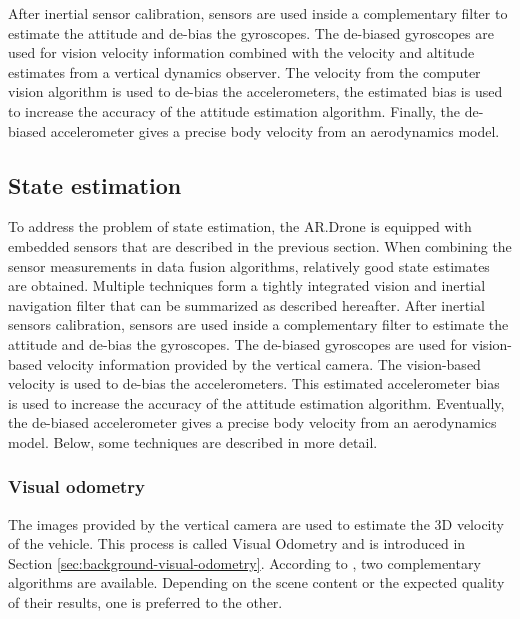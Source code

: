 After inertial sensor calibration, sensors are used inside a complementary filter to estimate the attitude and de-bias the gyroscopes.
The de-biased gyroscopes are used for vision velocity information combined with the velocity and altitude estimates from a vertical dynamics observer.
The velocity from the computer vision algorithm is used to de-bias the accelerometers, the estimated bias is used to increase the accuracy of the attitude estimation algorithm.
Finally, the de-biased accelerometer gives a precise body velocity from an aerodynamics model.


\subsection{State estimation}
To address the problem of state estimation, the AR.Drone is equipped with embedded sensors that are described in the previous section.
When combining the sensor measurements in data fusion algorithms, relatively good state estimates are obtained.
Multiple techniques form a tightly integrated vision and inertial navigation filter that can be summarized as described hereafter.
After inertial sensors calibration, sensors are used inside a complementary filter to estimate the attitude and de-bias the gyroscopes.
The de-biased gyroscopes are used for vision-based velocity information provided by the vertical camera.
The vision-based velocity is used to de-bias the accelerometers. This estimated accelerometer bias is used to increase the accuracy of the attitude estimation algorithm.
Eventually, the de-biased accelerometer gives a precise body velocity from an aerodynamics model.
Below, some techniques are described in more detail.

\subsubsection{Visual odometry}
\label{sec:platform-visual-odometry}
The images provided by the vertical camera are used to estimate the 3D velocity of the vehicle.
This process is called Visual Odometry and is introduced in Section \ref{sec:background-visual-odometry}.
According to \cite{bristeau2011navigation}, two complementary algorithms are available.
Depending on the scene content or the expected quality of their results, one is preferred to the other.

